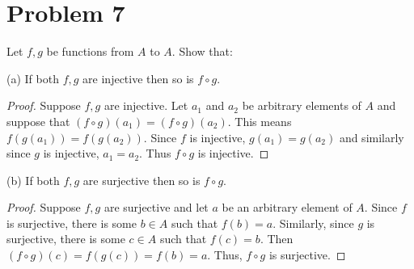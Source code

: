 \documentclass{article}
\begin{document}

    \section*{Problem 7}

    Let $f,g$ be functions from $A$ to $A$. Show that:

    (a) If both $f,g$ are injective then so is $f\circ g$.

    \begin{proof}
        Suppose $f,g$ are injective. Let $a_1$ and $a_2$ be arbitrary elements of $A$
        and suppose that $(f\circ g)(a_1)=(f\circ g)(a_2)$. This means $f(g(a_1))=f(g(a_2))$.
        Since $f$ is injective, $g(a_1)=g(a_2)$ and similarly since $g$ is injective, 
        $a_1=a_2$. Thus $f\circ g$ is injective.
    \end{proof}

    (b) If both $f,g$ are surjective then so is $f\circ g$.

    \begin{proof}
        Suppose $f,g$ are surjective and let $a$ be an arbitrary element of $A$. Since 
        $f$ is surjective, there is some $b\in A$ such that $f(b)=a$. Similarly, since 
        $g$ is surjective, there is some $c\in A$ such that $f(c)=b$. Then $(f\circ g)(c) =
        f(g(c)) = f(b) = a$. Thus, $f\circ g$ is surjective.
    \end{proof}
\end{document}
